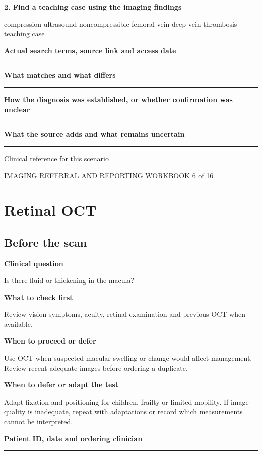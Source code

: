 \documentclass[11pt,a4paper]{article}
\newcommand{\record}[1]{\textbf{#1}\par\vspace{0.55\baselineskip}\hrule\vspace{0.35\baselineskip}}
\begin{document}
\textbf{2. Find a teaching case using the imaging findings}\par compression ultrasound noncompressible femoral vein deep vein thrombosis teaching case\par

\record{Actual search terms, source link and access date}

\record{What matches and what differs}

\record{How the diagnosis was established, or whether confirmation was unclear}

\record{What the source adds and what remains uncertain}

\small\href{https://www.nice.org.uk/guidance/ng158/chapter/Recommendations}{Clinical reference for this scenario}

\normalsize

\newpage

{\small IMAGING REFERRAL AND REPORTING WORKBOOK \hfill 6 of 16}

\section*{Retinal OCT}

\subsection*{Before the scan}

\textbf{Clinical question}\par Is there fluid or thickening in the macula?\par

\textbf{What to check first}\par Review vision symptoms, acuity, retinal examination and previous OCT when available.\par

\textbf{When to proceed or defer}\par Use OCT when suspected macular swelling or change would affect management. Review recent adequate images before ordering a duplicate.\par

\textbf{When to defer or adapt the test}\par Adapt fixation and positioning for children, frailty or limited mobility. If image quality is inadequate, repeat with adaptations or record which measurements cannot be interpreted.\par

\record{Patient ID, date and ordering clinician}
\end{document}
